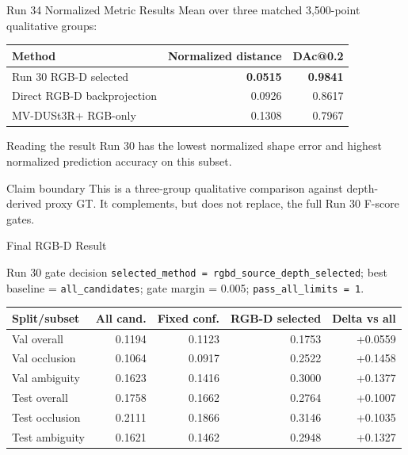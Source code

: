 \begin{frame}{Run 34 Normalized Metric Results}
  \small
  Mean over three matched 3,500-point qualitative groups:

  \vspace{0.12cm}
  \centering
  \begin{tabular}{lrr}
    \toprule
    \textbf{Method} & \textbf{Normalized distance} &
    \textbf{DAc@0.2} \\
    \midrule
    Run 30 RGB-D selected & \textbf{0.0515} & \textbf{0.9841} \\
    Direct RGB-D backprojection & 0.0926 & 0.8617 \\
    MV-DUSt3R+ RGB-only & 0.1308 & 0.7967 \\
    \bottomrule
  \end{tabular}

  \vspace{0.25cm}
  \begin{block}{Reading the result}
    Run 30 has the lowest normalized shape error and highest normalized
    prediction accuracy on this subset.
  \end{block}

  \begin{alertblock}{Claim boundary}
    This is a three-group qualitative comparison against depth-derived proxy
    GT. It complements, but does not replace, the full Run 30 F-score gates.
  \end{alertblock}
\end{frame}

\begin{frame}{Final RGB-D Result}
  \scriptsize
  \begin{block}{Run 30 gate decision}
    \texttt{selected\_method = rgbd\_source\_depth\_selected};
    best baseline = \texttt{all\_candidates};
    gate margin = 0.005;
    \texttt{pass\_all\_limits = 1}.
  \end{block}

  \vspace{0.08cm}
  \centering
  \begin{tabular}{lrrrr}
    \toprule
    \textbf{Split/subset} & \textbf{All cand.} & \textbf{Fixed conf.} &
    \textbf{RGB-D selected} & \textbf{Delta vs all} \\
    \midrule
    Val overall & 0.1194 & 0.1123 & 0.1753 & +0.0559 \\
    Val occlusion & 0.1064 & 0.0917 & 0.2522 & +0.1458 \\
    Val ambiguity & 0.1623 & 0.1416 & 0.3000 & +0.1377 \\
    \midrule
    Test overall & 0.1758 & 0.1662 & 0.2764 & +0.1007 \\
    Test occlusion & 0.2111 & 0.1866 & 0.3146 & +0.1035 \\
    Test ambiguity & 0.1621 & 0.1462 & 0.2948 & +0.1327 \\
    \bottomrule
  \end{tabular}
\end{frame}

